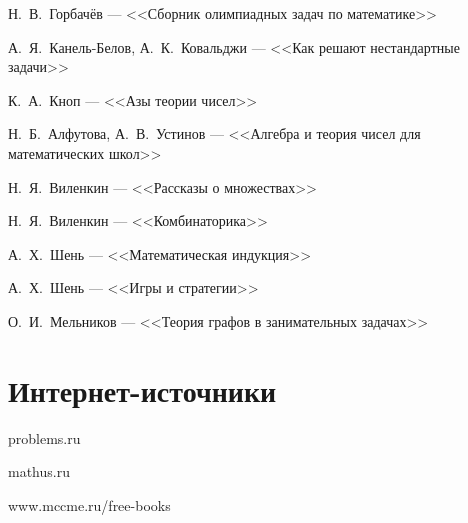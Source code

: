 \documentclass[a4paper,11pt,landscape]{article}
\begin{document}
\begin{paracol}{2}
Н.~В.~Горбачёв — <<Сборник олимпиадных задач по математике>>

А.~Я.~Канель-Белов, А.~К.~Ковальджи — <<Как решают \linebreak нестандартные задачи>>

К.~А.~Кноп — <<Азы теории чисел>>

Н.~Б.~Алфутова, А.~В.~Устинов — <<Алгебра и теория чисел для \linebreak математических школ>>

Н.~Я.~Виленкин — <<Рассказы о множествах>>

Н.~Я.~Виленкин — <<Комбинаторика>>

А.~Х.~Шень — <<Математическая индукция>>

А.~Х.~Шень — <<Игры и стратегии>>

О.~И.~Мельников — <<Теория графов в занимательных задачах>>

\section*{Интернет-источники}

problems.ru

mathus.ru

www.mccme.ru/free-books

\end{paracol}
\end{document}

